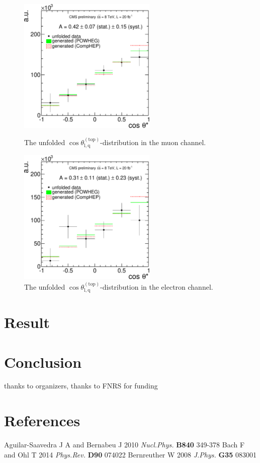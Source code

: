 \documentclass[a4paper]{jpconf}
\newcommand{\costheta}[0]{\cos\theta_{\mathrm{l,q}}^{\mathrm{(top)}}}
\begin{document}
\begin{figure}[h]
\begin{center}
\begin{minipage}{7cm}
\includegraphics[height=6.5cm]{costheta_unfolded_mu-crop}
\caption{\label{fig:unfolded_mu}The unfolded $\costheta$-distribution in the muon channel.}
\end{minipage}\hspace{1cm}%
\begin{minipage}{7cm}
\includegraphics[height=6.5cm]{costheta_unfolded_el-crop}
\caption{\label{fig:unfolded_el}The unfolded $\costheta$-distribution in the electron channel.}
\end{minipage} 
\end{center}
\end{figure}

\section{Result}
\section{Conclusion}

thanks to organizers,
thanks to FNRS for funding


\section*{References}
\begin{thebibliography}{9}
 Aguilar-Saavedra J A and Bernabeu J 2010 {\it Nucl.Phys.} {\bf B840} 349-378 
 Bach F and Ohl T 2014 {\it Phys.Rev.} {\bf D90} 074022 
 Bernreuther W 2008 {\it J.Phys.} {\bf G35} 083001 


\end{thebibliography}
\end{document}
